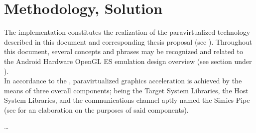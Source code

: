 

\chapter{Methodology, Solution}
\label{cha:methodologysolution}
The implementation constitutes the realization of the paravirtualized technology described in this document and corresponding thesis proposal (see ).
Throughout this document, several concepts and phrases may be recognized and related to the Android Hardware OpenGL ES emulation design overview (see section  under ).\\

\noindent
In accordance to the \dvttermreferenceimplementation , paravirtualized graphics acceleration is achieved by the means of three overall components; being the Target System Libraries, the Host System Libraries, and the communications channel aptly named the Simics Pipe (see  for an elaboration on the purposes of said components).



\ldots


